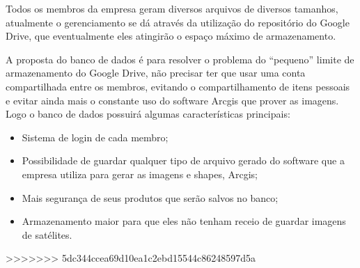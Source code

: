   Todos os membros da empresa geram diversos arquivos de diversos tamanhos, atualmente o gerenciamento se dá através da utilização do
  repositório do Google Drive, que eventualmente eles atingirão o espaço máximo de armazenamento.

  A proposta do banco de dados é para resolver o problema do “pequeno” limite de armazenamento do Google Drive, não precisar ter que
  usar uma conta compartilhada entre os membros, evitando o compartilhamento de itens pessoais e evitar ainda mais o constante uso do
  software Arcgis que prover as imagens. Logo o banco de dados possuirá algumas características principais:

  \begin{itemize}
    \item{Sistema de login de cada membro;}
    \item{Possibilidade de guardar qualquer tipo de arquivo gerado do software que a empresa utiliza para gerar as imagens e shapes,
      Arcgis;}
    \item{Mais segurança de seus produtos que serão salvos no banco;}
    \item{Armazenamento maior para que eles não tenham receio de guardar imagens de satélites.}
  \end{itemize}

>>>>>>> 5dc344ccea69d10ea1c2ebd15544c86248597d5a

